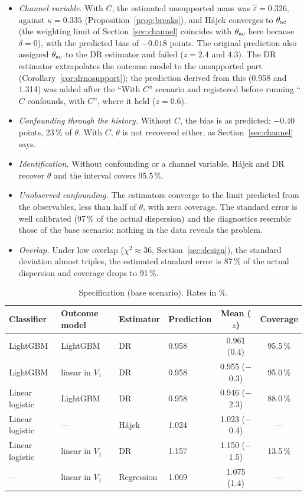 \begin{itemize}
  \item \emph{Channel variable.} With $C$, the estimated unsupported mass was $\hat\varepsilon=0.326$, against $\kappa=0.335$ (Proposition~\ref{prop:breaks}), and Hájek converges to $\theta_{\mathrm{ac}}$ (the weighting limit of Section~\ref{sec:channel} coincides with $\theta_{\mathrm{ac}}$ here because $\delta=0$), with the predicted bias of $-0.018$ points. The original prediction also assigned $\theta_{\mathrm{ac}}$ to the DR estimator and failed ($z=2.4$ and $4.3$). The DR estimator extrapolates the outcome model to the unsupported part (Corollary~\ref{cor:drnosupport}); the prediction derived from this (0.958 and 1.314) was added after the ``With $C$'' scenario and registered before running ``$C$ confounds, with $C$'', where it held ($z=0.6$).
  \item \emph{Confounding through the history.} Without $C$, the bias is as predicted: $-0.40$ points, 23\,\% of $\theta$. With $C$, $\theta$ is not recovered either, as Section~\ref{sec:channel} says.
  \item \emph{Identification.} Without confounding or a channel variable, Hájek and DR recover $\theta$ and the interval covers 95.5\,\%.
  \item \emph{Unobserved confounding.} The estimators converge to the limit predicted from the observables, less than half of $\theta$, with zero coverage. The standard error is well calibrated (97\,\% of the actual dispersion) and the diagnostics resemble those of the base scenario: nothing in the data reveals the problem.
  \item \emph{Overlap.} Under low overlap ($\chi^2\approx36$, Section~\ref{sec:design}), the standard deviation almost triples, the estimated standard error is 87\,\% of the actual dispersion and coverage drops to 91\,\%.
\end{itemize}

\begin{table}[ht]
\centering\small
\caption{Specification (base scenario). Rates in \%.}\label{tab:specification}
\begin{tabular}{@{}llllcc@{}}
\toprule
Classifier & Outcome model & Estimator & Prediction & Mean ($z$) & Coverage \\
\midrule
LightGBM & LightGBM & DR & 0.958 & 0.961 (0.4) & 95.5\,\% \\
LightGBM & linear in $V_1$ & DR & 0.958 & 0.955 ($-$0.3) & 95.0\,\% \\
Linear logistic & LightGBM & DR & 0.958 & 0.946 ($-$2.3) & 88.0\,\% \\
Linear logistic & --- & Hájek & 1.024 & 1.023 ($-$0.4) & --- \\
Linear logistic & linear in $V_1$ & DR & 1.157 & 1.150 ($-$1.5) & 13.5\,\% \\
--- & linear in $V_1$ & Regression & 1.069 & 1.075 (1.4) & --- \\
\bottomrule
\end{tabular}
\end{table}

